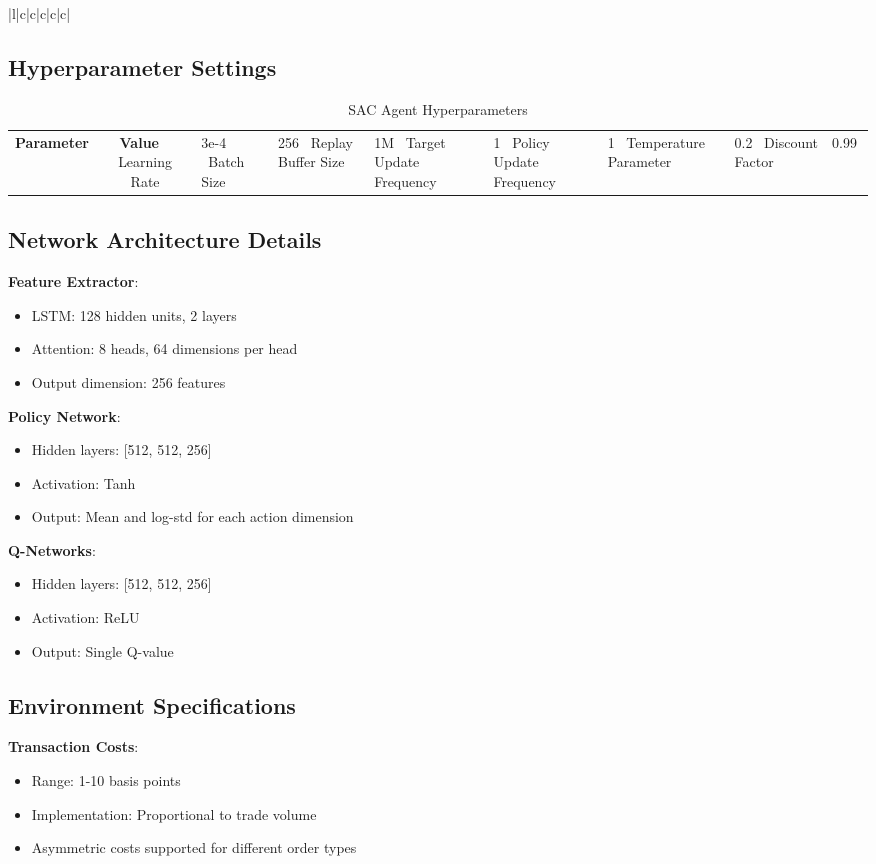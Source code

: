 \documentclass[11pt,a4paper]{article}
\begin{document}
\begin{table}[h]
\begin{tabular}{|l|c|c|c|c|c|}
\subsection{Hyperparameter Settings}

\begin{table}[h]
\centering
\caption{SAC Agent Hyperparameters}
\begin{tabular}{|l|c|}
\hline
\textbf{Parameter} & \textbf{Value} \
\hline
Learning Rate & 3e-4 \
Batch Size & 256 \
Replay Buffer Size & 1M \
Target Update Frequency & 1 \
Policy Update Frequency & 1 \
Temperature Parameter & 0.2 \
Discount Factor & 0.99 \
\hline
\end{tabular}
\label{tab:hyperparams}
\end{table}

\subsection{Network Architecture Details}

\textbf{Feature Extractor}:
\begin{itemize}
\item LSTM: 128 hidden units, 2 layers
\item Attention: 8 heads, 64 dimensions per head
\item Output dimension: 256 features
\end{itemize}

\textbf{Policy Network}:
\begin{itemize}
\item Hidden layers: [512, 512, 256]
\item Activation: Tanh
\item Output: Mean and log-std for each action dimension
\end{itemize}

\textbf{Q-Networks}:
\begin{itemize}
\item Hidden layers: [512, 512, 256]
\item Activation: ReLU
\item Output: Single Q-value
\end{itemize}

\subsection{Environment Specifications}

\textbf{Transaction Costs}:
\begin{itemize}
\item Range: 1-10 basis points
\item Implementation: Proportional to trade volume
\item Asymmetric costs supported for different order types
\end{itemize}


\end{tabular}
\end{table}
\end{document}
